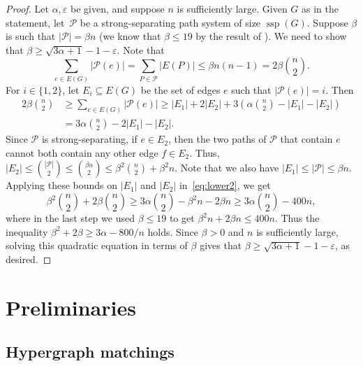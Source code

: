 \documentclass[a4paper, 11pt,reqno]{amsart}
\newcommand{\calP}{\mathcal{P}}
\theoremstyle{plain}
\theoremstyle{definition}
\numberwithin{equation}{section}
\DeclareMathOperator{\ssp}{ssp}
\newcommand{\eps}{\varepsilon}
\begin{document}
\begin{proof}
	Let $\alpha, \eps$ be given, and suppose $n$ is sufficiently large.
	Given $G$ as in the statement, let~$\mathcal{P}$ be a
        strong-separating path system of size $\ssp(G)$.
	Suppose $\beta$ is such 
  that $|\mathcal{P}| = \beta n$ (we know that $\beta \leq 19$ by the result of \cite{BBDNS2023}).
  We need to show that $\beta \geq \sqrt{3 \alpha + 1} - 1 - \eps$.
  Note that
  \begin{equation*}
  	\sum_{e \in E(G)} | \mathcal{P}(e)| = \sum_{P \in \mathcal{P}}
  	|E(P)| \leq \beta n(n-1) = 2 \beta \binom{n}{2}.
  \end{equation*}
  For $i \in \{1, 2\}$, let $E_i \subseteq E(G)$ be the set of edges
  $e$ such that $|\mathcal{P}(e)| = i$.  Then
  \begin{align}
  	2 \beta \binom{n}{2} & \geq \sum_{e \in E(G)} |\mathcal{P}(e)| \geq |E_1| + 2 |E_2| + 3
  	\left( \alpha \binom{n}{2} - |E_1| - |E_2| \right) \nonumber \\
  	& = 3 \alpha \binom{n}{2} - 2 |E_1| - |E_2|. \label{eq:lower2}
  \end{align}
  Since $\calP$ is strong-separating, if $e\in E_2$, then
  the two paths of $\calP$ that contain $e$ cannot both contain any
  other edge $f\in E_2$. Thus, $|E_2| \leq \binom{|\mathcal{P}|}{2} \leq
  \binom{\beta n}{2} \leq \beta^2 \binom{n}{2} + \beta^2n$. Note that we
  also have $|E_1| \leq |\mathcal{P}| \leq \beta n$. 
  Applying these bounds on $|E_1|$ and $|E_2|$ in~\eqref{eq:lower2}, we get
  \[
  \beta^2 \binom{n}{2} +  2\beta \binom{n}{2} 
  \geq 3 \alpha \binom{n}{2} - \beta^2n - 2\beta n
  \geq 3 \alpha \binom{n}{2}- 400n,
  \]
  where in the last step we used $\beta \leq 19$ to get $\beta^2 n + 2
  \beta n \leq 400n$.  Thus the inequality $\beta^2 + 2\beta \geq 3
  \alpha - 800/n$ holds. Since $\beta > 0$ and $n$ is sufficiently
  large, solving this quadratic equation in terms of $\beta$ gives
  that $\beta \geq \sqrt{3 \alpha + 1} - 1 - \eps$, as desired.
\end{proof}

\section{Preliminaries} \label{section:preliminaries}


\subsection{Hypergraph matchings}
\end{document}
